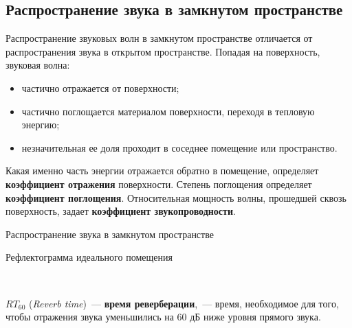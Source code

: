 \documentclass{beamer}
\begin{document}
\subsection{Распространение звука в замкнутом пространстве}
\begin{frame}
  Распространение звуковых волн в замкнутом пространстве отличается от распространения звука в открытом пространстве. Попадая на поверхность, звуковая волна:
  \begin{itemize}
    \item частично отражается от поверхности;
    \item частично поглощается материалом поверхности, переходя в тепловую энергию;
    \item незначительная ее доля проходит в соседнее помещение или пространство.
  \end{itemize}

  Какая именно часть энергии отражается обратно в помещение, определяет \textbf{коэффициент отражения} поверхности. Степень поглощения определяет \textbf{коэффициент поглощения}. Относительная мощность волны, прошедшей сквозь поверхность, задает \textbf{коэффициент звукопроводности}.
\end{frame}

\begin{frame}
  \begin{block}{Распространение звука в замкнутом пространстве}
  \end{block}
\end{frame}

\begin{frame}
  \begin{block}{Рефлектограмма идеального помещения}
  \end{block}
  
  ~
  
  $RT_{60}$ (\emph{Reverb time})~--- \textbf{время реверберации},~--- время, необходимое для того, чтобы отражения звука уменьшились на 60 дБ ниже уровня прямого звука.  
\end{frame}
\end{document}
